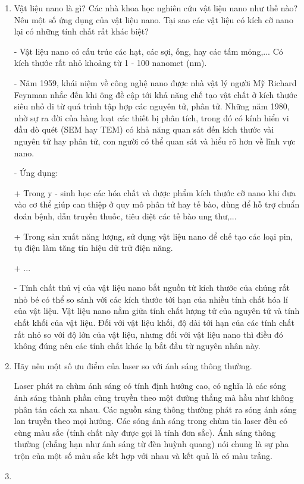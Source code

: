 \begin{enumerate}[label=\bfseries Câu \arabic*:]
{		Tập hợp các mezon và các barion có tên chung là hadron.
		
	}
	
	\item {}
	
	
	{
		Vật liệu nano là gì? Các nhà khoa học nghiên cứu vật liệu nano như thế nào? Nêu một số ứng dụng của vật liệu nano. Tại sao các vật liệu có kích cỡ nano lại có những tính chất rất khác biệt?
	}
	
	\hideall
	{
		- Vật liệu nano có cấu trúc các hạt, các sợi, ống, hay các tấm mỏng,... Có kích thước rất nhỏ khoảng từ 1 - 100 nanomet (nm).
		
		- Năm 1959, khái niệm về công nghệ nano được nhà vật lý người Mỹ Richard Feynman nhắc đến khi ông đề cập tới khả năng chế tạo vật chất ở kích thước siêu nhỏ đi từ quá trình tập hợp các nguyên tử, phân tử. Những năm 1980, nhờ sự ra đời của hàng loạt các thiết bị phân tích, trong đó có kính hiển vi đầu dò quét (SEM hay TEM) có khả năng quan sát đến kích thước vài nguyên tử hay phân tử, con người có thể quan sát và hiểu rõ hơn về lĩnh vực nano. 
		
		- Ứng dụng: 
		
		+ Trong y - sinh học các hóa chất và dược phẩm kích thước cỡ nano khi đưa vào cơ thể giúp can thiệp ở quy mô phân tử hay tế bào, dùng để hỗ trợ chuẩn đoán bệnh, dẫn truyền thuốc, tiêu diệt các tế bào ung thư,...
		
		+ Trong sản xuất năng lượng, sử dụng vật liệu nano để chế tạo các loại pin, tụ điện làm tăng tín hiệu dữ trữ điện năng.
		
		+ ...
		
		- Tính chất thú vị của vật liệu nano bắt nguồn từ kích thước của chúng rất nhỏ bé có thể so sánh với các kích thước tới hạn của nhiều tính chất hóa lí của vật liệu. Vật liệu nano nằm giữa tính chất lượng tử của nguyên tử và tính chất khối của vật liệu. Đối với vật liệu khối, độ dài tới hạn của các tính chất rất nhỏ so với độ lớn của vật liệu, nhưng đối với vật liệu nano thì điều đó không đúng nên các tính chất khác lạ bắt đầu từ nguyên nhân này.
	}
	\item {}
	
	
	{
		Hãy nêu một số ưu điểm của laser so với ánh sáng thông thường.
	}
	
	\hideall
	{
		Laser phát ra chùm ánh sáng có tính định hướng cao, có nghĩa là các sóng ánh sáng thành phần cùng truyền theo một đường thẳng mà hầu như không phân tán cách xa nhau. Các nguồn sáng thông thường phát ra sóng ánh sáng lan truyền theo mọi hướng. Các sóng ánh sáng trong chùm tia laser đều có cùng màu sắc (tính chất này được gọi là tính đơn sắc). Ánh sáng thông thường (chẳng hạn như ánh sáng từ đèn huỳnh quang) nói chung là sự pha trộn của một số màu sắc kết hợp với nhau và kết quả là có màu trắng.
	}
	\item {}
	

\end{enumerate}
